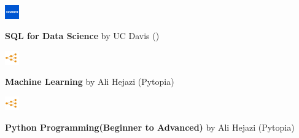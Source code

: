\documentclass[9pt, purple]{./template/cv} %
\begin{document}
\begin{minipage}{\linewidth}
\begin{minipage}[t]{\linewidth}
        \begin{minipage}{1cm}
            \vspace{-\baselineskip}
            \includegraphics[width=6mm]{img/coursera}\centering
        \end{minipage}
        \begin{minipage}{0.8\linewidth}
            \vspace{-\baselineskip}
            \textcolor{text!85}{\textbf{SQL for Data Science} \space \pipe \space by UC Davis ()}
        \end{minipage}
    
    \end{minipage}
    
    \vspace{0.3cm}
    
    \begin{minipage}[t]{\linewidth}
    
        \begin{minipage}{1cm}
            \vspace{-\baselineskip}
            \includegraphics[width=6mm]{img/pytopia}\centering
        \end{minipage}
        \begin{minipage}{0.8\linewidth}
            \vspace{-\baselineskip}
            \textcolor{text!85}{\textbf{Machine Learning} \space \pipe \space by Ali Hejazi (Pytopia)}
        \end{minipage}
    
    \end{minipage}

    \vspace{0.3cm}
    
    \begin{minipage}[t]{\linewidth}
    
        \begin{minipage}{1cm}
            \vspace{-\baselineskip}
            \includegraphics[width=6mm]{img/pytopia}\centering
        \end{minipage}
        \begin{minipage}{0.8\linewidth}
            \vspace{-\baselineskip}
            \textcolor{text!85}{\textbf{Python Programming(Beginner to Advanced)} \space \pipe \space by Ali Hejazi (Pytopia)}
        \end{minipage}
    

\end{minipage}
\end{minipage}
\end{document}
